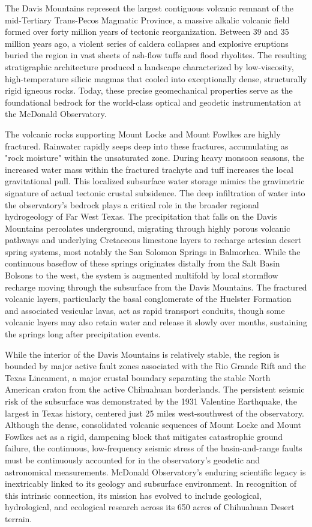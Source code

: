 The Davis Mountains represent the largest contiguous volcanic remnant of the mid-Tertiary Trans-Pecos Magmatic Province, a massive alkalic volcanic field formed over forty million years of tectonic reorganization. Between 39 and 35 million years ago, a violent series of caldera collapses and explosive eruptions buried the region in vast sheets of ash-flow tuffs and flood rhyolites. The resulting stratigraphic architecture produced a landscape characterized by low-viscosity, high-temperature silicic magmas that cooled into exceptionally dense, structurally rigid igneous rocks. Today, these precise geomechanical properties serve as the foundational bedrock for the world-class optical and geodetic instrumentation at the McDonald Observatory.

The volcanic rocks supporting Mount Locke and Mount Fowlkes are highly fractured. Rainwater rapidly seeps deep into these fractures, accumulating as "rock moisture" within the unsaturated zone. During heavy monsoon seasons, the increased water mass within the fractured trachyte and tuff increases the local gravitational pull. This localized subsurface water storage mimics the gravimetric signature of actual tectonic crustal subsidence. The deep infiltration of water into the observatory's bedrock plays a critical role in the broader regional hydrogeology of Far West Texas. The precipitation that falls on the Davis Mountains percolates underground, migrating through highly porous volcanic pathways and underlying Cretaceous limestone layers to recharge artesian desert spring systems, most notably the San Solomon Springs in Balmorhea. While the continuous baseflow of these springs originates distally from the Salt Basin Bolsons to the west, the system is augmented multifold by local stormflow recharge moving through the subsurface from the Davis Mountains. The fractured volcanic layers, particularly the basal conglomerate of the Huelster Formation and associated vesicular lavas, act as rapid transport conduits, though some volcanic layers may also retain water and release it slowly over months, sustaining the springs long after precipitation events.

While the interior of the Davis Mountains is relatively stable, the region is bounded by major active fault zones associated with the Rio Grande Rift and the Texas Lineament, a major crustal boundary separating the stable North American craton from the active Chihuahuan borderlands. The persistent seismic risk of the subsurface was demonstrated by the 1931 Valentine Earthquake, the largest in Texas history, centered just 25 miles west-southwest of the observatory. Although the dense, consolidated volcanic sequences of Mount Locke and Mount Fowlkes act as a rigid, dampening block that mitigates catastrophic ground failure, the continuous, low-frequency seismic stress of the basin-and-range faults must be continuously accounted for in the observatory's geodetic and astronomical measurements. McDonald Observatory’s enduring scientific legacy is inextricably linked to its geology and subsurface environment. In recognition of this intrinsic connection, its mission has evolved to include geological, hydrological, and ecological research across its 650 acres of Chihuahuan Desert terrain.

